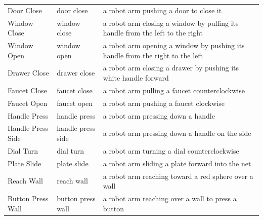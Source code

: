 \begin{table}[h]
{\begin{tabular}{@{}lll@{}}
Door Close       & door close                           & a robot arm pushing a door to close it                                                                 \\
Window Close     & window close                         & a robot arm closing a window by pulling its handle from the left to the right                                                                      \\
Window Open      & window open                          & a robot arm opening a window by pushing its handle from the right to the left                                                                      \\
Drawer Close     & drawer close                         & a robot arm closing a drawer by pushing its white handle forward                                                                      \\
Faucet Close     & faucet close                         & a robot arm pulling a faucet counterclockwise                                                                      \\
Faucet Open      & faucet open                          & a robot arm pushing a faucet clockwise                                                                      \\
Handle Press     & handle press                         & a robot arm pressing down a handle                                                                      \\
Handle Press Side     & handle press side                & a robot arm pressing down a handle on the side                                                                      \\
Dial Turn     & dial turn                          & a robot arm turning a dial counterclockwise                                                                      \\
Plate Slide     & plate slide                          & a robot arm sliding a plate forward into the net                                                                      \\
Reach Wall     & reach wall                          & a robot arm reaching toward a red sphere over a wall                                                                      \\
Button Press Wall    & button press wall                         & a robot arm reaching over a wall to press a button                                                                      \\ \midrule

\end{tabular}}
\end{table}
